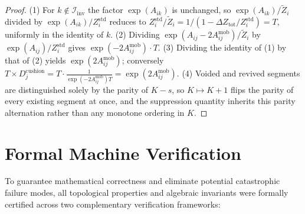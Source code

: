 \documentclass[11pt,a4paper]{article}
\theoremstyle{definition}
\begin{document}
\begin{proof}
(1) For $k \notin \mathcal{I}_{\text{inv}}$ the factor $\exp(A_{ik})$ is unchanged, so $\exp(A_{ik})/\tilde{Z}_i$ divided by $\exp(A_{ik})/Z_i^{\mathrm{std}}$ reduces to $Z_i^{\mathrm{std}}/\tilde{Z}_i = 1/(1 - \Delta Z_{\text{tot}}/Z_i^{\mathrm{std}}) = T$, uniformly in the identity of $k$. (2) Dividing $\exp(A_{ij} - 2A_{ij}^{\text{mob}})/\tilde{Z}_i$ by $\exp(A_{ij})/Z_i^{\mathrm{std}}$ gives $\exp(-2A_{ij}^{\text{mob}}) \cdot T$. (3) Dividing the identity of (1) by that of (2) yields $\exp(2A_{ij}^{\text{mob}})$; conversely $T \times D_j^{\text{cushion}} = T \cdot \frac{1}{\exp(-2A_{ij}^{\text{mob}}) T} = \exp(2A_{ij}^{\text{mob}})$. (4) Voided and revived segments are distinguished solely by the parity of $K - s$, so $K \mapsto K + 1$ flips the parity of every existing segment at once, and the suppression quantity inherits this parity alternation rather than any monotone ordering in $K$.
\end{proof}

\section{Formal Machine Verification}
To guarantee mathematical correctness and eliminate potential catastrophic failure modes, all topological properties and algebraic invariants were formally certified across two complementary verification frameworks:
\end{document}
